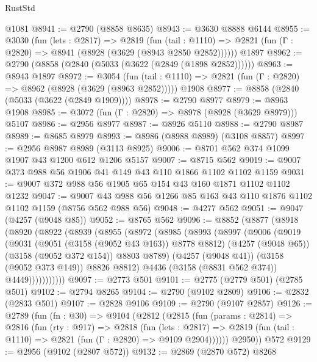 \begin{lexlean}{RustStd}
\begin{coremodule}
{\begin{coremodule}
{{{{{{{{{{{{{{{{{{{{{{{{{{    @1081
@8941 := @2790 (@8858 @8635)
@8943 := @3630 @8888 @6144
@8955 := @3030
    (fun (lets : @2817) =>
    @2819
      (fun (tail : @1110) => @2821 (fun (Γ : @2820) => @8941 (@8928 (@3629 (@8943 @2850 @2852))))))
    @1897
@8962 := @2790 (@8858 (@2840 (@5033 (@3622 (@2849 (@1898 @2852))))))
@8963 := @8943 @1897
@8972 := @3054
    (fun (tail : @1110) => @2821 (fun (Γ : @2820) => @8962 (@8928 (@3629 (@8963 @2852)))))
    @1908
@8977 := @8858 (@2840 (@5033 (@3622 (@2849 @1909))))
@8978 := @2790 @8977
@8979 := @8963 @1908
@8985 := @3072 (fun (Γ : @2820) => @8978 (@8928 (@3629 @8979))) @5107
@8986 := @2956 @8977
@8987 := @8926 @5110
@8988 := @2790 @8987
@8989 := @8685 @8979
@8993 := @8986 (@8988 @8989) (@3108 @8857)
@8997 := @2956 @8987 @8989 (@3113 @8925)
@9006 := @8701 @562 @374 @1099 @1907 @43 @1200 @612 @1206 @5157
@9007 := @8715 @562
@9019 := @9007 @373 @988 @56 @1906 @41 @149 @43 @110 @1866 @1102 @1102 @1159
@9031 := @9007 @372 @988 @56 @1905 @65 @154 @43 @160 @1871 @1102 @1102 @1232
@9047 := @9007 @43 @988 @56 @1266 @85 @163 @43 @110 @1876 @1102 @1102 @1159 (@8756 @562 @988 @56)
@9048 := @4277 @562
@9051 := @9047 (@4257 (@9048 @85))
@9052 := @8765 @562
@9096 := @8852
    (@8877
      (@8918
        (@8920
          (@8922
            (@8939
              (@8955
                (@8972
                  (@8985
                    (@8993
                      (@8997
                        (@9006
                          (@9019
                            (@9031
                              (@9051 (@3158 (@9052 @43 @163)) @8778 @8812)
                              (@4257 (@9048 @65))
                              (@3158 (@9052 @372 @154))
                              @8803
                              @8789)
                            (@4257 (@9048 @41))
                            (@3158 (@9052 @373 @149))
                            @8826
                            @8812)
                          @4436
                          (@3158 (@8831 @562 @374))
                          @4449)))))))))))
@9097 := @2773 @501
@9101 := @2775 (@2779 @501) (@2785 @501)
@9102 := @2794 @8265
@9104 := @2790 (@9102 @2809)
@9106 := @2832 (@2833 @501)
@9107 := @2828 @9106
@9109 := @2790 (@9107 @2857)
@9126 := @2789
    (fun (fn : @30) =>
    @9104
      (@2812
        (@2815
          (fun (params : @2814) =>
          @2816
            (fun (rty : @917) =>
            @2818
              (fun (lets : @2817) =>
              @2819 (fun (tail : @1110) => @2821 (fun (Γ : @2820) => @9109 @2904))))))
        @2950))
    @572
@9129 := @2956 (@9102 (@2807 @572))
@9132 := @2869 (@2870 @572) @8268
}}}}}}}}}}}}}}}}}}}}}}}}}}
\end{coremodule}}
\end{coremodule}
\end{lexlean}
